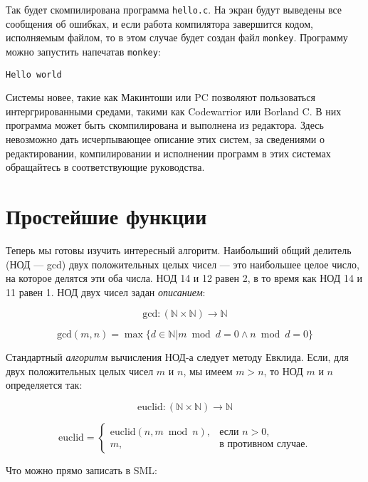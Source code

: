 Так будет скомпилирована программа \verb|hello.c|. На экран будут выведены все сообщения об ошибках, и если работа компилятора завершится кодом, исполняемым файлом, то в этом случае будет создан файл \verb|monkey|. Программу можно запустить напечатав \verb|monkey|:

\begin{verbatim}
Hello world
\end{verbatim}

Системы новее, такие как Макинтоши или PC позволяют пользоваться интергрированными средами, такими как Codewarrior или Borland C. В них программа может быть скомпилирована и выполнена из редактора. Здесь невозможно дать исчерпывающее описание этих систем, за сведениями о редактировании, компилировании и исполнении программ в этих системах обращайтесь в соответствующие руководства.

\section{Простейшие функции}\label{ElementaryFunctions}

Теперь мы готовы изучить интересный алгоритм. Наибольший общий делитель (НОД --- gcd) двух положительных целых чисел --- это наибольшее целое число, на которое делятся эти оба числа. НОД 14 и 12 равен 2, в то время как НОД 14 и 11 равен 1. НОД двух чисел задан \emph{описанием}:

$$\text{gcd} : (\mathbb{N} \times \mathbb{N}) \to \mathbb{N}$$

\begin{equation}
  \text{gcd}(m, n) = \max \{d \in \mathbb{N} | m \bmod d = 0 \wedge n \bmod d = 0\}
\end{equation}

Стандартный \emph{алгоритм} вычисления НОД-а следует методу Евклида. Если, для двух положительных целых чисел $m$ и $n$, мы имеем $m>n$, то НОД $m$ и $n$ определяется так:

$$\text{euclid} : (\mathbb{N} \times \mathbb{N}) \to \mathbb{N}$$

\begin{equation}
 \text{euclid} = \begin{cases}
\text{euclid}(n, m \bmod n), & \text{если $n>0$,}\\
m, & \text{в противном случае.}
\end{cases} 
\end{equation}

Что можно прямо записать в SML:


